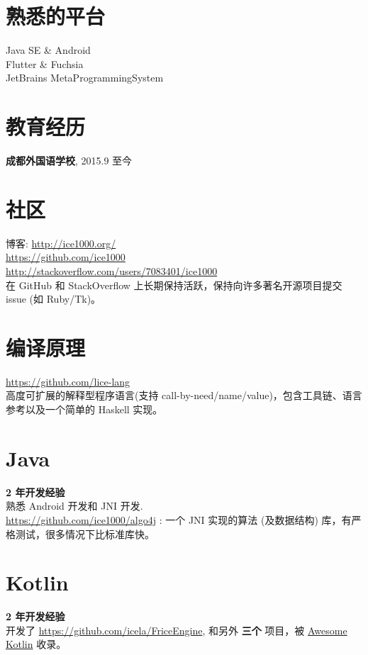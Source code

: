\documentclass[margin, line]{res}
\begin{document}
\begin{CJK}{UTF8}{gbsn}
  \begin{resume}
    \section{\sc 熟悉的平台}
    Java SE \& Android \\
    Flutter \& Fuchsia \\
    JetBrains MetaProgrammingSystem
    
    \section{\sc 教育经历}
    \textbf{成都外国语学校}, 2015.9 至今
    
    \section{\sc 社区}
    博客: \url{http://ice1000.org/} \\
    \url{https://github.com/ice1000} \\
    \url{http://stackoverflow.com/users/7083401/ice1000} \\
    在 GitHub 和 StackOverflow 上长期保持活跃，保持向许多著名开源项目提交 issue (如 Ruby/Tk)。
    
    \section{\sc 编译原理}
    \url{https://github.com/lice-lang} \\
    高度可扩展的解释型程序语言(支持 call-by-need/name/value)，包含工具链、语言参考以及一个简单的 Haskell 实现。

    \section{\sc Java}
    \textbf{2 年开发经验} \\
    熟悉 Android 开发和 JNI 开发. \\
    \url{https://github.com/ice1000/algo4j} :
    一个 JNI 实现的算法 (及数据结构) 库，有严格测试，很多情况下比标准库快。
    
    \section{\sc Kotlin}
    \textbf{2 年开发经验} \\
    开发了
    \url{https://github.com/icela/FriceEngine},
    和另外
    \textbf{三个} 项目，被
    \href{https://kotlin.link/?q=ice} {Awesome Kotlin}
    收录。
    

\end{resume}
\end{CJK}
\end{document}
